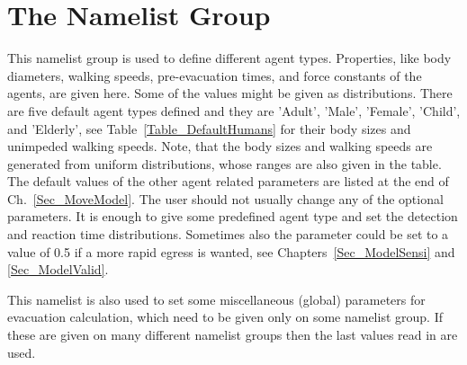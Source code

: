 \documentclass[12pt,a4paper,final,twoside]{stylevk}
\begin{document}
\section{The  Namelist Group}\label{Sec_PersNML}

\noindent This namelist group is used to define different agent types.
Properties, like body diameters, walking speeds, pre-evacuation times,
and force constants of the agents, are given here.  Some of the values
might be given as distributions.  There are five default agent types
defined and they are 'Adult', 'Male', 'Female', 'Child', and
'Elderly', see Table~\ref{Table_DefaultHumans} for their body sizes
and unimpeded walking speeds.  Note, that the body sizes and walking
speeds are generated from uniform distributions, whose ranges are also
given in the table.  The default values of the other agent related
parameters are listed at the end of Ch.~\ref{Sec_MoveModel}.  The user
should not usually change any of the optional parameters.  It is
enough to give some predefined agent type and set the detection and
reaction time distributions.  Sometimes also the parameter
 could be set to a value of 0.5 if a more rapid
egress is wanted, see Chapters~\ref{Sec_ModelSensi} and
\ref{Sec_ModelValid}.


This namelist is also used to set some miscellaneous (global)
parameters for evacuation calculation, which need to be given only on
some  namelist group.  If these are given on many
different  namelist groups then the last values read in
are used.
\end{document}
